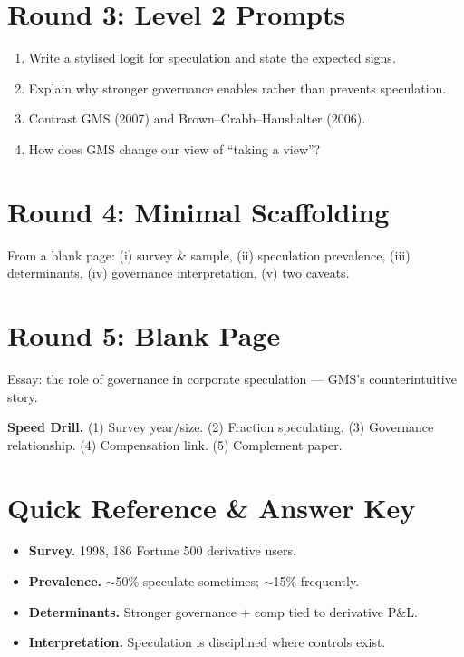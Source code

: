 \documentclass[11pt]{article}
\begin{document}
\section*{Round 3: Level 2 Prompts}
\begin{enumerate}
\item Write a stylised logit for speculation and state the expected signs.
\item Explain why stronger governance enables rather than prevents speculation.
\item Contrast GMS (2007) and Brown--Crabb--Haushalter (2006).
\item How does GMS change our view of ``taking a view''?
\end{enumerate}

\section*{Round 4: Minimal Scaffolding}
From a blank page: (i) survey \& sample, (ii) speculation prevalence, (iii) determinants, (iv) governance interpretation, (v) two caveats.

\section*{Round 5: Blank Page}
Essay: the role of governance in corporate speculation --- GMS's counterintuitive story.

\vspace{6pt}
\begin{drillbox}
\textbf{Speed Drill.} (1) Survey year/size. (2) Fraction speculating. (3) Governance relationship. (4) Compensation link. (5) Complement paper.
\end{drillbox}

\section*{Quick Reference \& Answer Key}
\begin{answerbox}
\begin{itemize}
\item \textbf{Survey.} 1998, 186 Fortune 500 derivative users.
\item \textbf{Prevalence.} $\sim$50\% speculate sometimes; $\sim$15\% frequently.
\item \textbf{Determinants.} Stronger governance $+$ comp tied to derivative P\&L.
\item \textbf{Interpretation.} Speculation is disciplined where controls exist.
\end{itemize}
\end{answerbox}
\end{document}
